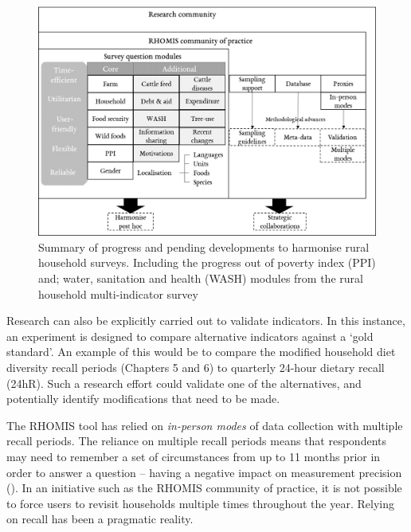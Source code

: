 \begin{figure}
\includegraphics[width=1\textwidth]{figs_07/RHOMIS.png}
  \captionsetup{singlelinecheck = false, justification=justified} %
  \caption{Summary of progress and pending developments to harmonise rural household surveys. Including the progress out of poverty index (PPI) and; water, sanitation and health (WASH) modules from the rural household multi-indicator survey}
  \label{fig:07_1}
\end{figure}

Research can also be explicitly carried out to validate indicators. In this instance, an experiment is designed to compare alternative indicators against a `gold standard'. An example of this would be to compare the modified household diet diversity recall periods (Chapters 5 and 6) to quarterly 24-hour dietary recall (24hR). Such a research effort could validate one of the alternatives, and potentially identify modifications that need to be made.

The RHOMIS tool has relied on \textit{in-person modes} of data collection with multiple recall periods. The reliance on multiple recall periods means that respondents may need to remember a set of circumstances from up to 11 months prior in order to answer a question -- having a negative impact on measurement precision (\citealp{Beegle2012}). In an initiative such as the RHOMIS community of practice, it is not possible to force users to revisit households multiple times throughout the year. Relying on recall has been a pragmatic reality.

